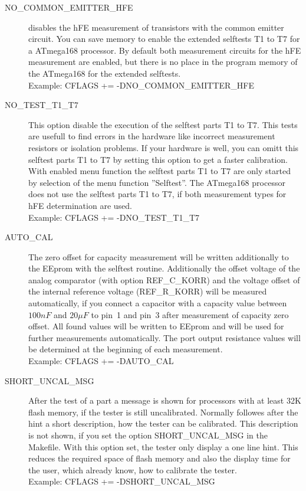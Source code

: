 \begin{description}
  \item[NO\_COMMON\_EMITTER\_HFE] disables the hFE measurement of transistors with the common emitter circuit.
You can save memory to enable the extended selftests T1 to T7 for a ATmega168 processor.
By default both measurement circuits for the hFE measurement are enabled, 
but there is no place in the program memory of the ATmega168 for the extended selftests.\\
Example: CFLAGS += -DNO\_COMMON\_EMITTER\_HFE

  \item[NO\_TEST\_T1\_T7] This option disable the execution of the selftest parts T1 to T7.
This tests are usefull to find errors in the hardware like incorrect measurement resistors or isolation problems.
If your hardware is well, you can omitt this selftest parts T1 to T7 by setting this option to get a faster calibration.
With enabled menu function the selftest parts T1 to T7 are only started by selection of the menu function ''Selftest''.
The ATmega168 processor does not use the selftest parts T1 to T7, if both measurement types for hFE determination are used.\\
Example: CFLAGS += -DNO\_TEST\_T1\_T7

  \item[AUTO\_CAL] The zero offset for capacity measurement will be written additionally
to the EEprom with the selftest routine. Additionally the offset voltage of the analog comparator (with option REF\_C\_KORR) and the
voltage offset of the internal reference voltage (REF\_R\_KORR) will be measured automatically, if you connect a
capacitor with a capacity value between \(100nF\) and \(20\mu F\) to pin~1 and pin~3 after measurement of capacity zero offset. 
All found values will be written to EEprom and will be used for further measurements automatically.
The port output resistance values will be determined at the beginning of each measurement.\\
Example: CFLAGS += -DAUTO\_CAL

  \item[SHORT\_UNCAL\_MSG] After the test of a part a message is shown for processors with at least 32K flash memory,
if the tester is still uncalibrated. Normally followes after the hint a short description, how the
tester can be calibrated. This description is not shown, if you set the option SHORT\_UNCAL\_MSG in the Makefile.
With this option set, the tester only display a one line hint.
This reduces the required space of flash memory  and also the display time for the user,
which already know, how to calibrate the tester.\\
Example: CFLAGS += -DSHORT\_UNCAL\_MSG


\end{description}
